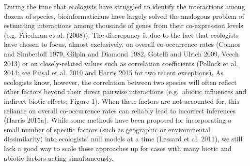 \documentclass[12pt,]{article}
\begin{document}
\begin{spacing}{1.9}
\begin{flushleft}
During the time that ecologists have struggled to identify the
interactions among dozens of species, bioinformaticians have largely
solved the analogous problem of estimating interactions among thousands
of genes from their co-expression levels (e.g. Friedman et al. (2008)).
The discrepancy is due to the fact that ecologists have chosen to focus,
almost exclusively, on overall co-occurrence rates (Connor and
Simberloff 1979, Gilpin and Diamond 1982, Gotelli and Ulrich 2009, Veech
2013) or on closely-related values such as correlation coefficients
(Pollock et al. 2014; see Faisal et al. 2010 and Harris 2015 for two
recent exceptions). As ecologists know, however, the correlation between
two species will often reflect other factors beyond their direct
pairwise interactions (e.g.~abiotic influences and indirect biotic
effects; Figure 1). When these factors are not accounted for, this
reliance on overall co-occurrence rates can reliably lead to incorrect
inferences (Harris 2015a). While some methods have been proposed for
incorporating a small number of specific factors (such as geographic or
environmental dissimilarity) into ecologists' null models at a time
(Lessard et al. 2011), we still lack a good way to scale these
approaches up for cases with many biotic and abiotic factors acting
simultaneously.


\end{flushleft}
\end{spacing}
\end{document}
